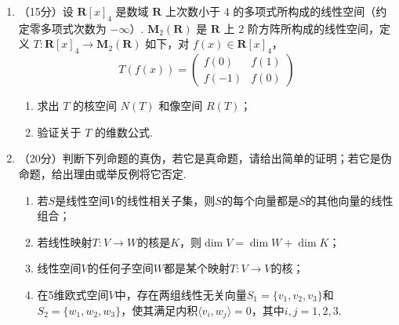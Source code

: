 \begin{enumerate}
    \item （15分）设 $\mathbf{R}[x]_4$ 是数域 $\mathbf{R}$ 上次数小于 4 的多项式所构成的线性空间（约定零多项式次数为 $-\infty$）. $\mathbf{M}_2(\mathbf{R})$ 是 $\mathbf{R}$ 上 2 阶方阵所构成的线性空间，定义 $T\colon \mathbf{R}[x]_4 \to \mathbf{M}_2(\mathbf{R})$ 如下，对 $f(x) \in \mathbf{R}[x]_4$，
    \[T(f(x))=\begin{pmatrix}f(0) & f(1) \\ f(-1) & f(0)\end{pmatrix}\]
    \begin{enumerate}
        \item 求出 $T$ 的核空间 $N(T)$ 和像空间 $R(T)$；

        \item 验证关于 $T$ 的维数公式.
    \end{enumerate}

    \item （20分）判断下列命题的真伪，若它是真命题，请给出简单的证明；若它是伪命题，给出理由或举反例将它否定.
    \begin{enumerate}
        \item 若$S$是线性空间$V$的线性相关子集，则$S$的每个向量都是$S$的其他向量的线性组合；

        \item 若线性映射$T\colon V\to W$的核是$K$，则$\dim V=\dim W+\dim K$；

        \item 线性空间$V$的任何子空间$W$都是某个映射$T\colon V\to V$的核；

        \item 在5维欧式空间$V$中，存在两组线性无关向量$S_1=\{v_1,v_2,v_3\}$和$S_2=\{w_1,w_2,w_3\}$，使其满足内积$\langle v_i,w_j\rangle=0$，其中$i,j=1,2,3$.
    \end{enumerate}
\end{enumerate}

\clearpage
